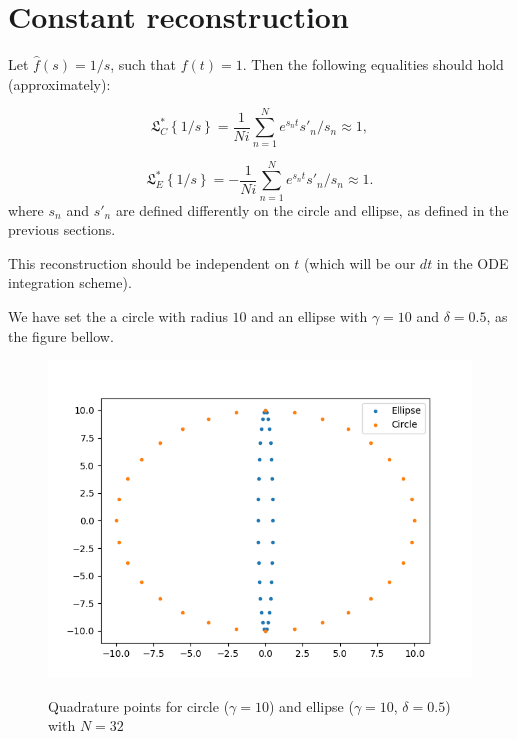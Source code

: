 \documentclass[10pt,a4paper,final]{article}
\begin{document}
\section{Constant reconstruction}

Let $\widehat{f}(s)=1/s$, such that $f(t)=1$. Then the following equalities should hold (approximately):

\begin{equation}
{ \mathfrak{ L } }^{ * }_C\left\{ 1/s \right\}=\frac { 1 }{ Ni} \sum _{ n=1 }^{ N }{ { e }^{ { s }_{ n }t }{ s }'_{ n } /s_n} \approx 1,
\end{equation}

\begin{equation}\label{milt_ellipse}
{ \mathfrak{ L } }^{ * }_E\left\{ 1/s  \right\}=-\frac { 1 }{  Ni} \sum _{ n=1 }^{ N }{ { e }^{ { s }_{ n }t }{ s }'_{ n }/s_n }\approx 1.
\end{equation}
where $s_n$ and $s'_n$ are defined differently on the circle and ellipse, as defined in the previous sections.

This reconstruction should be independent on $t$ (which will be our $dt$ in the ODE integration scheme).

We have set the a circle with radius $10$ and an ellipse with $\gamma=10$ and $\delta=0.5$, as the figure bellow.
\begin{figure}[h!]
\centering
\includegraphics[scale=0.5]{ellip_circ}
\label{fig:quad_elip_circ}
\caption{Quadrature points for circle ($\gamma=10$) and ellipse ($\gamma=10$, $\delta=0.5$) with $N=32$}
\end{figure}
\end{document}
